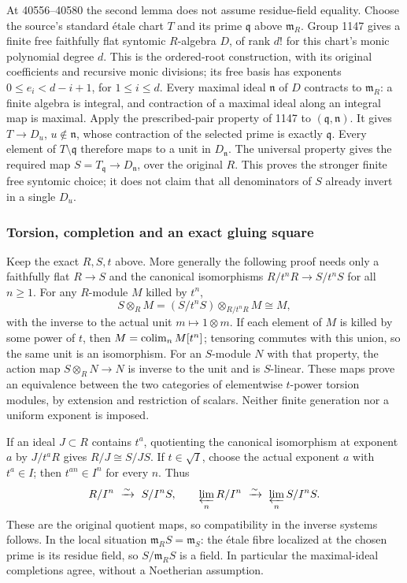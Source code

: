 At 40556--40580 the second lemma does not assume residue-field equality. Choose the source's standard étale chart \(T\) and its prime \(\mathfrak q\) above \(\mathfrak m_R\). Group 1147 gives a finite free faithfully flat syntomic \(R\)-algebra \(D\), of rank \(d!\) for this chart's monic polynomial degree \(d\). This is the ordered-root construction, with its original coefficients and recursive monic divisions; its free basis has exponents \(0\leq e_i<d-i+1\), for \(1\leq i\leq d\). Every maximal ideal \(\mathfrak n\) of \(D\) contracts to \(\mathfrak m_R\): a finite algebra is integral, and contraction of a maximal ideal along an integral map is maximal. Apply the prescribed-pair property of 1147 to \((\mathfrak q,\mathfrak n)\). It gives \(T\to D_u\), \(u\notin\mathfrak n\), whose contraction of the selected prime is exactly \(\mathfrak q\). Every element of \(T\setminus\mathfrak q\) therefore maps to a unit in \(D_{\mathfrak n}\). The universal property gives the required map \(S=T_{\mathfrak q}\to D_{\mathfrak n}\), over the original \(R\). This proves the stronger finite free syntomic choice; it does not claim that all denominators of \(S\) already invert in a single \(D_u\).

\subsubsection{Torsion, completion and an exact gluing square}\label{algebra-proof-054-torsion-completion-and-an-exact-gluing-square}

Keep the exact \(R,S,t\) above. More generally the following proof needs only a faithfully flat \(R\to S\) and the canonical isomorphisms \(R/t^nR\to S/t^nS\) for all \(n\geq1\). For any \(R\)-module \(M\) killed by \(t^n\), \[
S\otimes_R M=(S/t^nS)\otimes_{R/t^nR}M\cong M,
\] with the inverse to the actual unit \(m\mapsto1\otimes m\). If each element of \(M\) is killed by some power of \(t\), then \(M=\mathop{\rm colim}_n M[t^n]\); tensoring commutes with this union, so the same unit is an isomorphism. For an \(S\)-module \(N\) with that property, the action map \(S\otimes_R N\to N\) is inverse to the unit and is \(S\)-linear. These maps prove an equivalence between the two categories of elementwise \(t\)-power torsion modules, by extension and restriction of scalars. Neither finite generation nor a uniform exponent is imposed.

If an ideal \(J\subset R\) contains \(t^a\), quotienting the canonical isomorphism at exponent \(a\) by \(J/t^aR\) gives \(R/J\cong S/JS\). If \(t\in\sqrt I\), choose the actual exponent \(a\) with \(t^a\in I\); then \(t^{an}\in I^n\) for every \(n\). Thus \[
R/I^n\ \xrightarrow{\sim}\ S/I^nS,\qquad
\varprojlim_n R/I^n\ \xrightarrow{\sim}\ \varprojlim_n S/I^nS.
\] These are the original quotient maps, so compatibility in the inverse systems follows. In the local situation \(\mathfrak m_RS=\mathfrak m_S\): the étale fibre localized at the chosen prime is its residue field, so \(S/\mathfrak m_RS\) is a field. In particular the maximal-ideal completions agree, without a Noetherian assumption.

